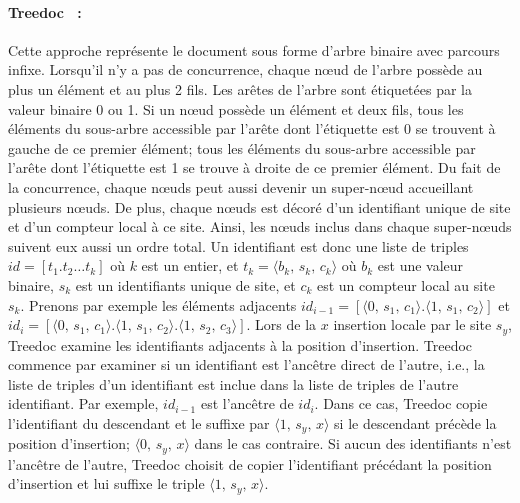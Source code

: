 \paragraph{Treedoc~\cite{letia2009crdts, preguica2009commutative} :} Cette
approche représente le document sous forme d'arbre binaire avec parcours infixe.
Lorsqu'il n'y a pas de concurrence, chaque nœud de l'arbre possède au plus un
élément et au plus 2 fils. Les arêtes de l'arbre sont étiquetées par la valeur
binaire 0 ou 1.  Si un nœud possède un élément et deux fils, tous les éléments
du sous-arbre accessible par l'arête dont l'étiquette est 0 se trouvent à gauche
de ce premier élément; tous les éléments du sous-arbre accessible par l'arête
dont l'étiquette est 1 se trouve à droite de ce premier élément. Du fait de la
concurrence, chaque nœuds peut aussi devenir un super-nœud accueillant plusieurs
nœuds. De plus, chaque nœuds est décoré d'un identifiant unique de site et d'un
compteur local à ce site. Ainsi, les nœuds inclus dans chaque super-nœuds
suivent eux aussi un ordre total. Un identifiant est donc une liste de triples
$id = [t_1.t_2\ldots t_k]$ où $k$ est un entier, et
$t_k = \langle b_k,\, s_k,\, c_k\rangle$ où $b_k$ est une valeur binaire, $s_k$
est un identifiants unique de site, et $c_k$ est un compteur local au site
$s_k$.  Prenons par exemple les éléments adjacents
$id_{i-1}=[\langle 0,\,s_1,\,c_1 \rangle.\langle 1,\,s_1,\,c_2 \rangle]$ et
$id_i=[\langle 0,\,s_1,\,c_1 \rangle.\langle 1,\,s_1,\,c_2 \rangle. \langle 1,\,
s_2,\, c_3 \rangle]$.
Lors de la $x$ insertion locale par le site $s_y$, Treedoc examine les
identifiants adjacents à la position d'insertion. Treedoc commence par examiner
si un identifiant est l'ancêtre direct de l'autre, i.e., la liste de triples
d'un identifiant est inclue dans la liste de triples de l'autre identifiant. Par
exemple, $id_{i-1}$ est l'ancêtre de $id_i$. Dans ce cas, Treedoc copie
l'identifiant du descendant et le suffixe par $\langle 1,\, s_y,\, x \rangle$ si
le descendant précède la position d'insertion; $\langle 0,\, s_y,\, x \rangle$
dans le cas contraire. Si aucun des identifiants n'est l'ancêtre de l'autre,
Treedoc choisit de copier l'identifiant précédant la position d'insertion et lui
suffixe le triple $\langle 1,\, s_y,\, x \rangle$.


